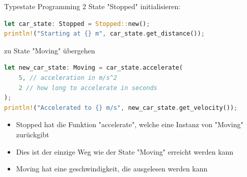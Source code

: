 \begin{frame}[fragile,t]{Typestate Programming 2}
    State "Stopped" initialisieren:
    \begin{lstlisting}[language=Rust,escapechar=@,label={lst:typestate-programming-2-1}]
let car_state: Stopped = Stopped::new();
println!("Starting at {} m", car_state.get_distance());
\end{lstlisting}


    \pause zu State "Moving" übergehen
    \begin{lstlisting}[language=Rust,escapechar=@,label={lst:typestate-programming-2-2}]
let new_car_state: Moving = car_state.accelerate(
    5, // acceleration in m/s^2
    2 // how long to accelerate in seconds
);
println!("Accelerated to {} m/s", new_car_state.get_velocity());
\end{lstlisting}

     {
        \begin{itemize}
            \item Stopped hat die Funktion "accelerate", welche eine Instanz von "Moving" zurückgibt
            \item Dies ist der einzige Weg wie der State "Moving" erreicht werden kann
            \item Moving hat eine geschwindigkeit, die ausgelesen werden kann
        \end{itemize}
    }
\end{frame}



